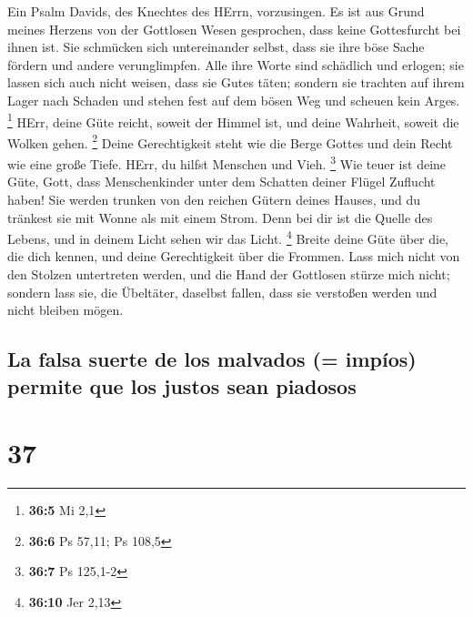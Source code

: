  Ein Psalm Davids, des Knechtes des HErrn, vorzusingen.
 Es ist aus Grund meines Herzens von der Gottlosen Wesen
gesprochen, dass keine Gottesfurcht bei ihnen ist.  Sie
schmücken sich untereinander selbst, dass sie ihre böse Sache fördern
und andere verunglimpfen.  Alle ihre Worte sind schädlich
und erlogen; sie lassen sich auch nicht weisen, dass sie Gutes täten;
 sondern sie trachten auf ihrem Lager nach Schaden und
stehen fest auf dem bösen Weg und scheuen kein Arges. \footnote{\textbf{36:5}
  Mi 2,1}  HErr, deine Güte reicht, soweit der Himmel ist,
und deine Wahrheit, soweit die Wolken gehen. \footnote{\textbf{36:6} Ps
  57,11; Ps 108,5}  Deine Gerechtigkeit steht wie die
Berge Gottes und dein Recht wie eine große Tiefe. HErr, du hilfst
Menschen und Vieh. \footnote{\textbf{36:7} Ps 125,1-2} 
Wie teuer ist deine Güte, Gott, dass Menschenkinder unter dem Schatten
deiner Flügel Zuflucht haben!  Sie werden trunken von den
reichen Gütern deines Hauses, und du tränkest sie mit Wonne als mit
einem Strom.  Denn bei dir ist die Quelle des Lebens, und
in deinem Licht sehen wir das Licht. \footnote{\textbf{36:10} Jer 2,13}
 Breite deine Güte über die, die dich kennen, und deine
Gerechtigkeit über die Frommen.  Lass mich nicht von den
Stolzen untertreten werden, und die Hand der Gottlosen stürze mich
nicht;  sondern lass sie, die Übeltäter, daselbst fallen,
dass sie verstoßen werden und nicht bleiben mögen.

\hypertarget{la-falsa-suerte-de-los-malvados-impuxedos-permite-que-los-justos-sean-piadosos}{%
\subsection{La falsa suerte de los malvados (= impíos) permite que los
justos sean
piadosos}\label{la-falsa-suerte-de-los-malvados-impuxedos-permite-que-los-justos-sean-piadosos}}

\hypertarget{section-36}{%
\section{37}\label{section-36}}

